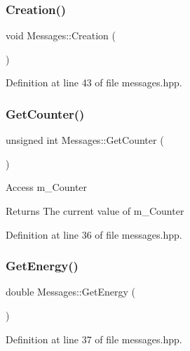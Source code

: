 \subsubsection{\texorpdfstring{Creation()}{Creation()}}
{\footnotesize\ttfamily void Messages\+::\+Creation (\begin{DoxyParamCaption}{ }\end{DoxyParamCaption})\hspace{0.3cm}{\ttfamily [inline]}}



Definition at line 43 of file messages.\+hpp.

\mbox{\label{class_messages_a256f8190d9ef6e25db6a5030f9805b5d}} 
\subsubsection{\texorpdfstring{Get\+Counter()}{GetCounter()}}
{\footnotesize\ttfamily unsigned int Messages\+::\+Get\+Counter (\begin{DoxyParamCaption}{ }\end{DoxyParamCaption})\hspace{0.3cm}{\ttfamily [inline]}}

Access m\+\_\+\+Counter \begin{DoxyReturn}{Returns}
The current value of m\+\_\+\+Counter 
\end{DoxyReturn}


Definition at line 36 of file messages.\+hpp.

\mbox{\label{class_messages_ab33cb49f408b16cf1fa29b5f141921c4}} 
\subsubsection{\texorpdfstring{Get\+Energy()}{GetEnergy()}}
{\footnotesize\ttfamily double Messages\+::\+Get\+Energy (\begin{DoxyParamCaption}{ }\end{DoxyParamCaption})\hspace{0.3cm}{\ttfamily [inline]}}



Definition at line 37 of file messages.\+hpp.

